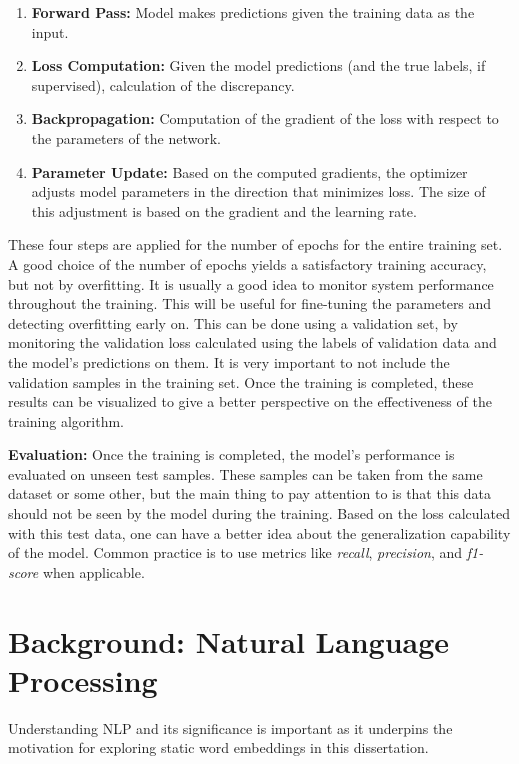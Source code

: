 \begin{enumerate}
  \item \textbf{Forward Pass:} Model makes predictions given the training data as the input.
  \item \textbf{Loss Computation:} Given the model predictions (and the true labels, if supervised), calculation of the discrepancy. 
  \item \textbf{Backpropagation:} Computation of the gradient of the loss with respect to the parameters of the network.
  \item \textbf{Parameter Update:} Based on the computed gradients, the optimizer adjusts model parameters in the direction that minimizes loss. The size of this adjustment is based on the gradient and the learning rate.
\end{enumerate}

These four steps are applied for the number of epochs for the entire training set. A good choice of the number of epochs yields a satisfactory training accuracy, but not by overfitting.
It is usually a good idea to monitor system performance throughout the training. This will be useful for fine-tuning the parameters and detecting overfitting early on. This can be done using a validation set, by monitoring the validation loss calculated using the labels of validation data and the model's predictions on them. It is very important to not include the validation samples in the training set. Once the training is completed, these results can be visualized to give a better perspective on the effectiveness of the training algorithm.

\textbf{Evaluation:} Once the training is completed, the model's performance is evaluated on unseen test samples. These samples can be taken from the same dataset or some other, but the main thing to pay attention to is that this data should not be seen by the model during the training. Based on the loss calculated with this test data, one can have a better idea about the generalization capability of the model. Common practice is to use metrics like \textit{recall}, \textit{precision}, and \textit{f1-score} when applicable.




\section{Background: Natural Language Processing}

Understanding \ac{NLP} and its significance is important as it underpins the motivation for exploring static word embeddings in this dissertation.

